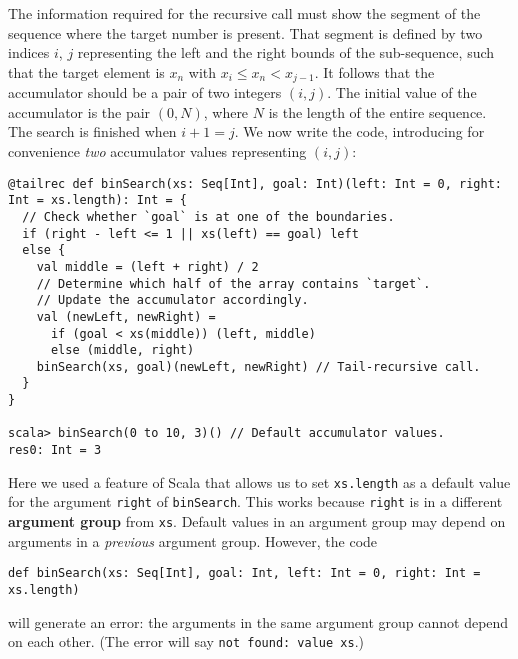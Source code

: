 The information required for the recursive call must show the segment
of the sequence where the target number is present. That segment is
defined by two indices $i$, $j$ representing the left and the right
bounds of the sub-sequence, such that the target element is $x_{n}$
with $x_{i}\leq x_{n}<x_{j-1}$. It follows that the accumulator should
be a pair of two integers $\left(i,j\right)$. The initial value of
the accumulator is the pair $\left(0,N\right)$, where $N$ is the
length of the entire sequence. The search is finished when $i+1=j$.
We now write the code, introducing for convenience \emph{two} accumulator
values representing $\left(i,j\right)$:
\begin{lstlisting}
@tailrec def binSearch(xs: Seq[Int], goal: Int)(left: Int = 0, right: Int = xs.length): Int = {
  // Check whether `goal` is at one of the boundaries.
  if (right - left <= 1 || xs(left) == goal) left
  else {
    val middle = (left + right) / 2
    // Determine which half of the array contains `target`.
    // Update the accumulator accordingly.
    val (newLeft, newRight) =
      if (goal < xs(middle)) (left, middle)
      else (middle, right)
    binSearch(xs, goal)(newLeft, newRight) // Tail-recursive call.
  }
}

scala> binSearch(0 to 10, 3)() // Default accumulator values.
res0: Int = 3
\end{lstlisting}
Here we used a feature of Scala that allows us to set \lstinline!xs.length!
as a default value for the argument \lstinline!right! of \lstinline!binSearch!.
This works because \lstinline!right! is in a different \textbf{argument
group} from \lstinline!xs!. Default values
in an argument group may depend on arguments in a \emph{previous}
argument group. However, the code
\begin{lstlisting}
def binSearch(xs: Seq[Int], goal: Int, left: Int = 0, right: Int = xs.length)
\end{lstlisting}
will generate an error: the arguments in the same argument group cannot
depend on each other. (The error will say \lstinline!not found: value xs!.)


